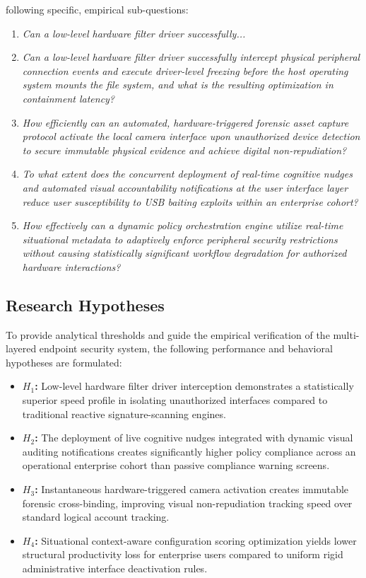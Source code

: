 \documentclass{ieeeaccess}
\begin{document}
 following specific, empirical sub-questions:
\begin{enumerate}
    \item \textit{Can a low-level hardware filter driver successfully...}

    \item \textit{Can a low-level hardware filter driver successfully intercept physical peripheral connection events and execute driver-level freezing before the host operating system mounts the file system, and what is the resulting optimization in containment latency?}
    \item \textit{How efficiently can an automated, hardware-triggered forensic asset capture protocol activate the local camera interface upon unauthorized device detection to secure immutable physical evidence and achieve digital non-repudiation?}
    \item \textit{To what extent does the concurrent deployment of real-time cognitive nudges and automated visual accountability notifications at the user interface layer reduce user susceptibility to USB baiting exploits within an enterprise cohort?}
    \item \textit{How effectively can a dynamic policy orchestration engine utilize real-time situational metadata to adaptively enforce peripheral security restrictions without causing statistically significant workflow degradation for authorized hardware interactions?}
\end{enumerate}

\subsection{Research Hypotheses}
To provide analytical thresholds and guide the empirical verification of the multi-layered endpoint security system, the following performance and behavioral hypotheses are formulated:
\begin{itemize}
    \item \textbf{$H_1$:} Low-level hardware filter driver interception demonstrates a statistically superior speed profile in isolating unauthorized interfaces compared to traditional reactive signature-scanning engines.
    \item \textbf{$H_2$:} The deployment of live cognitive nudges integrated with dynamic visual auditing notifications creates significantly higher policy compliance across an operational enterprise cohort than passive compliance warning screens.
    \item \textbf{$H_3$:} Instantaneous hardware-triggered camera activation creates immutable forensic cross-binding, improving visual non-repudiation tracking speed over standard logical account tracking.
    \item \textbf{$H_4$:} Situational context-aware configuration scoring optimization yields lower structural productivity loss for enterprise users compared to uniform rigid administrative interface deactivation rules.
\end{itemize}
\end{document}
